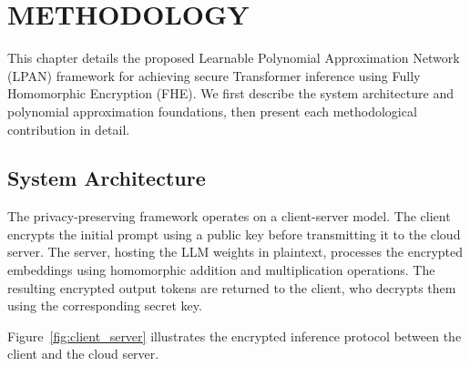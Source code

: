 \chapter{METHODOLOGY}
\label{ch:methodology}

This chapter details the proposed Learnable Polynomial Approximation Network (LPAN) framework for achieving secure Transformer inference using Fully Homomorphic Encryption (FHE). We first describe the system architecture and polynomial approximation foundations, then present each methodological contribution in detail.

\section{System Architecture}
The privacy-preserving framework operates on a client-server model. The client encrypts the initial prompt using a public key before transmitting it to the cloud server. The server, hosting the LLM weights in plaintext, processes the encrypted embeddings using homomorphic addition and multiplication operations. The resulting encrypted output tokens are returned to the client, who decrypts them using the corresponding secret key.

Figure~\ref{fig:client_server} illustrates the encrypted inference protocol between the client and the cloud server.


